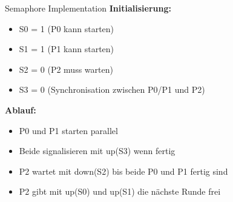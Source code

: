 \begin{example2}{Semaphore Implementation}
    \textbf{Initialisierung:}
    \begin{itemize}
        \item S0 = 1 (P0 kann starten)
        \item S1 = 1 (P1 kann starten) 
        \item S2 = 0 (P2 muss warten)
        \item S3 = 0 (Synchronisation zwischen P0/P1 und P2)
    \end{itemize}
    
    \textbf{Ablauf:}
    \begin{itemize}
        \item P0 und P1 starten parallel
        \item Beide signalisieren mit up(S3) wenn fertig
        \item P2 wartet mit down(S2) bis beide P0 und P1 fertig sind
        \item P2 gibt mit up(S0) und up(S1) die nächste Runde frei
    \end{itemize}
\end{example2}

